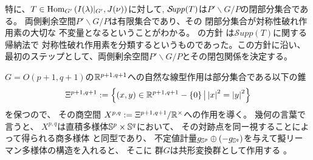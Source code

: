 \documentclass[12pt]{article} %
\newcommand{\Hom}{\mbox{\normalfont Hom}}
\newcommand{\Supp}{\mathcal{S}\!{\it upp}}
\theoremstyle{definition}
\theoremstyle{exampstyle} \newtheorem{examp}[theorem]{Theorem}
\newcommand{\IlambdaGprime}{I(\lambda)\kern-0.3em\mid_{G'}}
\newcommand{\SBO}{\Hom_{G'}\left(\IlambdaGprime,J(\nu) \right)}
\renewcommand{\setminus}{-}
\begin{document}
特に、$T\in\SBO$に対して, $\Supp(T)$は$P'\backslash G/P$の閉部分集合である。
両側剰余空間$P'\backslash G/P$は有限集合であり、その
閉部分集合が対称性破れ作用素の大切な
不変量となるということがわかる。
\cite{kobayashi2015symmetry}の方針
は$\mathcal{S}upp(T)$に関する帰納法で
対称性破れ作用素を分類するというものであった。この方針に沿い、最初のステップとして、両側剰余空間$P'\backslash G/P$とその閉包関係を決定する。

$G=O(p+1,q+1)$の$\mathbb{R}^{p+1,q+1}$への自然な線型作用は部分集合である以下の錐
$$\Xi^{p+1,q+1}:=\mysetn{(x,y)\in\R^{p+1,q+1}\setminus\left\{ 0 \right\}}{\myabs{x}^2=\myabs{y}^2}$$
を保つので、
その商空間
$X^{p,q}:=\Xi^{p+1,q+1}/\mathbb{R}^{\times}$への作用を導く。
幾何の言葉で言うと、
$X^{p,q}$は{直積多様体$\mathbb{S}^p\times\mathbb{S}^q$に{おいて}、
その対跡点を同ー視することによって得られる商多様体
と同型であり、
不定値計量$g_{\mathbb{S}^p}\oplus \left( -g_{\mathbb{S}^q} \right)$を与えて擬リーマン多様体の構造を入れると、
そこに
群$G$は共形変換群として作用する}
。
\end{document}
